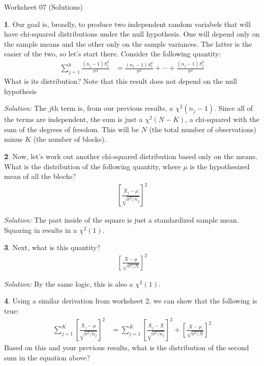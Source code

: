 \documentclass{tufte-handout}
\begin{document}
\justify

{\LARGE Worksheet 07 (Solutions)}

\vspace*{18pt}


\textbf{1}. Our goal is, broadly, to produce two independent random variabels that will have
chi-squared distributions under the null hypothesis. One will depend only on
the sample means and the other only on the sample variances. The latter is the
easier of the two, so let's start there. Consider the following quantity:
\begin{align*}
\sum_{j=1}^k \frac{(n_j - 1) S_j^2}{\sigma^2} &= \frac{(n_1 - 1) S_1^2}{\sigma^2} + \cdots + \frac{(n_j - 1) S_j^2}{\sigma^2}
\end{align*}
What is its distribution? Note that this result does not depend on the null
hypothesis

\textit{Solution:} The $j$th term is, from our previous results, a $\chi^2(n_j - 1)$. Since all
of the terms are independent, the sum is just a $\chi^2(N - K)$, a chi-squared
with the sum of the degrees of freedom. This will be $N$ (the total number of
observations) minus $K$ (the number of blocks).

\textbf{2}. Now, let's work out another chi-squared distribution based only on the means.
What is the distribution of the following quantity, where $\mu$ is the
hypothesized mean of all the blocks?
\begin{align*}
\left[\frac{\bar{X}_j - \mu}{\sqrt{\sigma^2 / n_j}}\right]^2
\end{align*} 

\textit{Solution:} The part inside of the square is just a standardized sample mean. Squaring
in results in a $\chi^2(1)$.

\textbf{3}. Next, what is this quantity?
\begin{align*}
\left[\frac{\bar{X} - \mu}{\sqrt{\sigma^2 / N}}\right]^2
\end{align*} 

\textit{Solution:} By the same logic, this is also a $\chi^2(1)$.

\textbf{4}. Using a similar derivation from worksheet 2, we can show that the following
is true:
\begin{align*}
\sum_{j=1}^K \left[\frac{\bar{X}_j - \mu}{\sqrt{\sigma^2 / n_j}}\right]^2 &=
\sum_{j=1}^K \left[\frac{\bar{X}_j - \bar{X}}{\sqrt{\sigma^2 / n_j}}\right]^2 +
\left[\frac{\bar{X} - \mu}{\sqrt{\sigma^2 / N}}\right]^2
\end{align*} 
Based on this and your previous results, what is the distribution of the 
second sum in the equation above?
\end{document}

